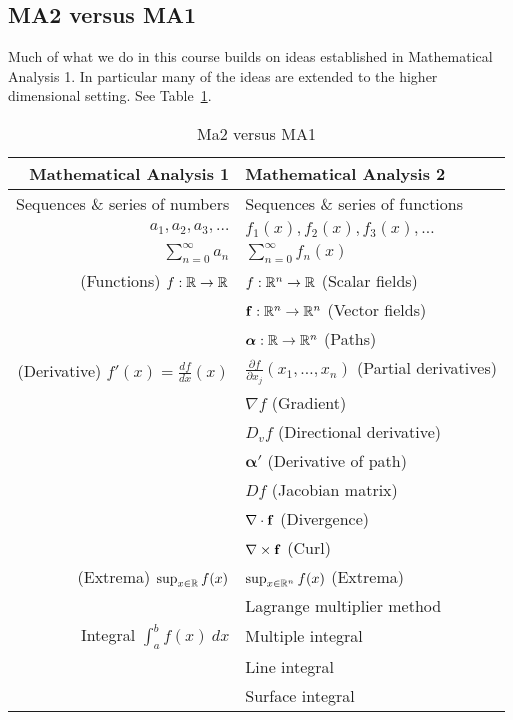 \subsection*{MA2 versus MA1}

Much of what we do in this course builds on ideas established in Mathematical Analysis 1.
In particular many of the ideas are extended to the higher dimensional setting. See Table~\ref{tab:2versus1}.

\begin{table}
  \centering
  \begin{tabular}{r | l} %
    \textbf{Mathematical Analysis 1}
     &
    \textbf{Mathematical Analysis 2}  \\
    \midrule
    Sequences \& series of numbers
     &
    Sequences \& series  of functions \\
    \(a_1, a_2, a_3,\ldots \)
     &
    \(f_1(x), f_2(x), f_3(x),\ldots \)
    \\
    \(\sum_{n=0}^{\infty} a_n\)
     &
    \(\sum_{n=0}^{\infty} f_n(x)\)
    \\
    \midrule
    (Functions) \(f:\mathbb{R} \to \mathbb{R}\)
     &
    \(f:\mathbb{R}^n \to \mathbb{R}\) (Scalar fields)
    \\
     &
    \(\mathbf{f}:\mathbb{R}^n \to \mathbb{R}^n\) (Vector fields)
    \\
     &
    \(\boldsymbol{\alpha}:\mathbb{R} \to \mathbb{R}^n\) (Paths)
    \\
    \midrule
    (Derivative) \( f'(x) = \frac{df}{dx}(x)\)
     &
    \( \frac{\partial f}{\partial x_j}(x_1,\ldots,x_n)\) (Partial derivatives)
    \\
     &
    \(\nabla f\) (Gradient)
    \\
     &
    \(D_v f\) (Directional derivative)
    \\
     &
    \(\boldsymbol{\alpha}'\) (Derivative of path)
    \\
     &
    \(Df\) (Jacobian matrix)
    \\
     &
    \(\nabla \cdot \mathbf{f}\) (Divergence)
    \\
     &
    \(\nabla \times \mathbf{f}\) (Curl)
    \\
    \midrule
    (Extrema) \(\sup_{x\in \mathbb{R}} f(x)\)
     &
    \(\sup_{x\in \mathbb{R}^n} f(x)\) (Extrema)
    \\
     &
    Lagrange multiplier method
    \\
    \midrule
    Integral \(\int_{a}^{b} f(x) \ dx\)
     &
    Multiple integral
    \\
     &
    Line integral
    \\
     &
    Surface integral
  \end{tabular}
  \caption{Ma2 versus MA1}%
  \label{tab:2versus1}
\end{table}

